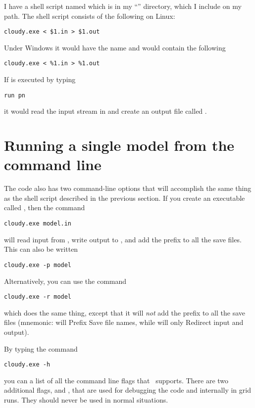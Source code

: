 I have a shell script named  which is in my
``'' directory, which
I include on my path.
The shell script  consists of the following on
Linux:
\begin{verbatim}
cloudy.exe < $1.in > $1.out
\end{verbatim}
Under Windows it would have the name  and would contain the following
\begin{verbatim}
cloudy.exe < %1.in > %1.out
\end{verbatim}
If  is executed by typing
\begin{verbatim}
run pn
\end{verbatim}
it would read the input stream in  and create
an output file called .

\section{Running a single model from the command line}
\label{sec:RunCommandLine}

The code also has two command-line options that will accomplish the same thing
as the shell script described in the previous section. If you create an
executable called , then the command
\begin{verbatim}
cloudy.exe model.in
\end{verbatim}
will read input from , write output to
, and add the prefix  to all the save
files.  This can also be written
\begin{verbatim}
cloudy.exe -p model
\end{verbatim}
Alternatively, you can use the command
\begin{verbatim}
cloudy.exe -r model
\end{verbatim}
which does the same thing, except that it will {\em not} add the prefix
 to all the save files (mnemonic:  will
Prefix Save file names, while  will only Redirect input
and output).

By typing the command
\begin{verbatim}
cloudy.exe -h
\end{verbatim}
you can a list of all the command line flags that \Cloudy\ supports.
There are two additional flags,  and ,
that are used for debugging the code and internally in grid runs.
They should never be used in normal situations.

